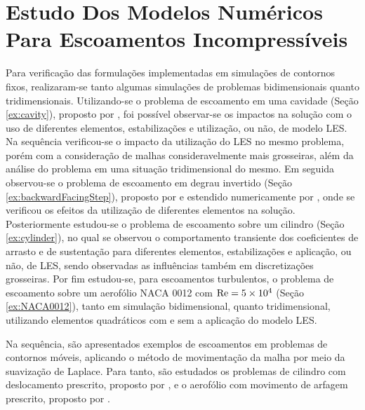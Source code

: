 \section{Estudo Dos Modelos Numéricos Para Escoamentos Incompressíveis} \label{ExemplosMT}

Para verificação das formulações implementadas em simulações de contornos fixos, realizaram-se tanto algumas simulações de problemas bidimensionais quanto tridimensionais. Utilizando-se o problema de escoamento em uma cavidade (Seção \ref{ex:cavity}), proposto por , foi possível observar-se os impactos na solução com o uso de diferentes elementos, estabilizações e utilização, ou não, de modelo LES. Na sequência verificou-se o impacto da utilização do LES no mesmo problema, porém com a consideração de malhas consideravelmente mais grosseiras, além da análise do problema em uma situação tridimensional do mesmo. Em seguida observou-se o problema de escoamento em degrau invertido (Seção \ref{ex:backwardFacingStep}), proposto por  e estendido numericamente por , onde se verificou os efeitos da utilização de diferentes elementos na solução. Posteriormente estudou-se o problema de escoamento sobre um cilindro (Seção \ref{ex:cylinder}), no qual se observou o comportamento transiente dos coeficientes de arrasto e de sustentação para diferentes elementos, estabilizações e aplicação, ou não, de LES, sendo observadas as influências também em discretizações grosseiras. Por fim estudou-se, para escoamentos turbulentos, o problema de escoamento sobre um aerofólio NACA 0012 com $\mathrm{Re}=5\times10^4$ (Seção \ref{ex:NACA0012}), tanto em simulação bidimensional, quanto tridimensional, utilizando elementos quadráticos com e sem a aplicação do modelo LES.

Na sequência, são apresentados exemplos de escoamentos em problemas de contornos móveis, aplicando o método de movimentação da malha por meio da suavização de Laplace. Para tanto, são estudados os problemas de cilindro com deslocamento prescrito, proposto por , e o aerofólio com movimento de arfagem prescrito, proposto por .

